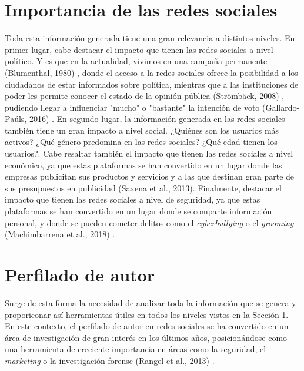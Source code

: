 \section{Importancia de las redes sociales}
\label{sec:intr_importancia}
Toda esta información generada tiene una gran relevancia a distintos niveles. En primer lugar, cabe destacar el impacto que
tienen las redes sociales a nivel político. Y es que en la actualidad, vivimos en una campaña permanente (Blumenthal, 1980)
\cite{sydney1980permanent}, 
donde el acceso a la redes sociales ofrece la posibilidad a los ciudadanos de estar informados sobre política, mientras que a las instituciones
de poder les permite conocer el estado de la opinión pública (Strömbäck, 2008)
\cite{stromback2008four}, pudiendo llegar a influenciar "mucho" o "bastante" la intención de voto (Gallardo-Paúls, 2016) \cite{gallardo2016pseudopolitica}.
En segundo lugar, la información generada en las redes sociales también tiene un gran impacto a nivel social. ¿Quiénes son los
usuarios más activos? ¿Qué género predomina en las redes sociales? ¿Qué edad tienen los usuarios?. Cabe resaltar también el
impacto que tienen las redes sociales a nivel económico, ya que estas plataformas se han convertido en un lugar donde las empresas
publicitan sus productos y servicios y a las que destinan gran parte de sus presupuestos en publicidad 
(Saxena et al., 2013)\cite{saxena2013advertising}. Finalmente, destacar el impacto que tienen las redes sociales a nivel de seguridad,
ya que estas plataformas se han convertido en un lugar donde se comparte información personal, y donde se pueden cometer delitos como
el \textit{cyberbullying} o el \textit{grooming} (Machimbarrena et al., 2018) \cite{machimbarrena2018internet}.

\section{Perfilado de autor}
\label{sec:intro_perfilado}
Surge de esta forma la necesidad de analizar toda la información que se genera y proporiconar así herramientas útiles en todos los niveles vistos en la Sección \ref{sec:intr_importancia}.
En este contexto, el perfilado de autor en redes sociales se ha convertido en un área de investigación de gran interés
en los últimos años, posicionándose como una herramienta de creciente importancia en áreas como la seguridad, el \textit{marketing}
o la investigación forense (Rangel et al., 2013) \cite{rangel2013overview}.


